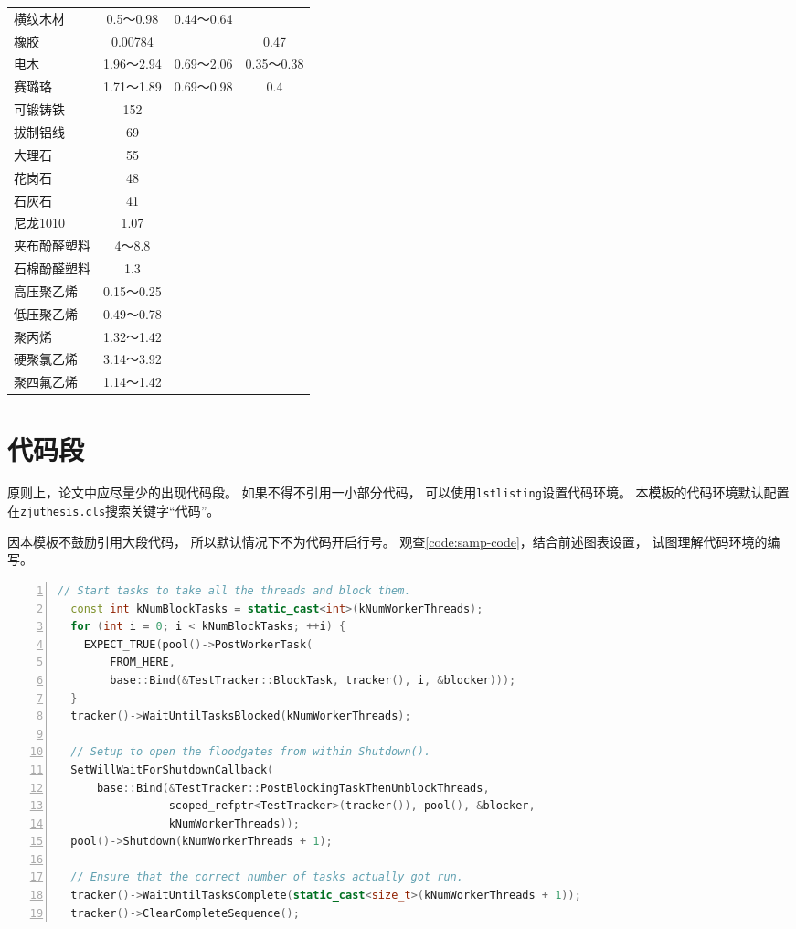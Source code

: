\begin{longtabu}{lccc}
横纹木材   &  0.5～0.98 &  0.44～0.64 &   \\
橡胶     & 0.00784 &        & 0.47 \\
电木     &  1.96～2.94 &  0.69～2.06 &  0.35～0.38 \\
赛璐珞    &  1.71～1.89 &  0.69～0.98 & 0.4 \\
可锻铸铁   & 152    &        &  \\
拔制铝线   & 69     &        &  \\
大理石    & 55     &        &  \\
花岗石    & 48     &        &  \\
石灰石    & 41     &        &  \\
尼龙1010 & 1.07   &        &  \\
夹布酚醛塑料 &  4～8.8 &        &  \\
石棉酚醛塑料 & 1.3    &        &  \\
高压聚乙烯  &  0.15～0.25 &        &  \\
低压聚乙烯  &  0.49～0.78 &        &  \\
聚丙烯    &  1.32～1.42 &        &  \\
硬聚氯乙烯  &  3.14～3.92 &        &  \\
聚四氟乙烯  &  1.14～1.42 &        &  \\
\end{longtabu}%


\section{代码段}

原则上，论文中应尽量少的出现代码段。
如果不得不引用一小部分代码，
可以使用\texttt{lstlisting}设置代码环境。
本模板的代码环境默认配置在\texttt{zjuthesis.cls}搜索关键字“代码”。

因本模板不鼓励引用大段代码，
所以默认情况下不为代码开启行号。
观查\autoref{code:samp-code}，结合前述图表设置，
试图理解代码环境的编写。

\begin{lstlisting}[language=C++,numbers=left, numberstyle=\tiny,label=code:samp-code, caption=一段Chromium的源代码]
// Start tasks to take all the threads and block them.
  const int kNumBlockTasks = static_cast<int>(kNumWorkerThreads);
  for (int i = 0; i < kNumBlockTasks; ++i) {
    EXPECT_TRUE(pool()->PostWorkerTask(
        FROM_HERE,
        base::Bind(&TestTracker::BlockTask, tracker(), i, &blocker)));
  }
  tracker()->WaitUntilTasksBlocked(kNumWorkerThreads);

  // Setup to open the floodgates from within Shutdown().
  SetWillWaitForShutdownCallback(
      base::Bind(&TestTracker::PostBlockingTaskThenUnblockThreads,
                 scoped_refptr<TestTracker>(tracker()), pool(), &blocker,
                 kNumWorkerThreads));
  pool()->Shutdown(kNumWorkerThreads + 1);

  // Ensure that the correct number of tasks actually got run.
  tracker()->WaitUntilTasksComplete(static_cast<size_t>(kNumWorkerThreads + 1));
  tracker()->ClearCompleteSequence();
\end{lstlisting}

